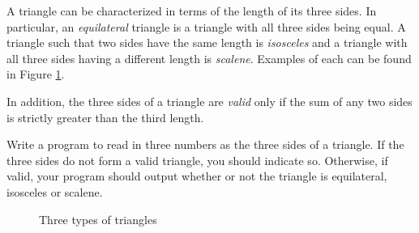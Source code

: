 \begin{exer}
A triangle can be characterized in terms of the length of its three sides.  In particular, an \emph{equilateral}
triangle is a triangle with all three sides being equal.  A triangle such that two sides have the same length 
is \emph{isosceles} and a triangle with all three sides having a different length is \emph{scalene}.  Examples
of each can be found in Figure \ref{figure:triangleTypes}.

In addition, the three sides of a triangle are \emph{valid} only if the sum of any two sides is strictly greater 
than the third length.

Write a program to read in three numbers as the three sides of a triangle.  If the three sides do not
form a valid triangle, you should indicate so.  Otherwise, if valid, your program should output whether or
not the triangle is equilateral, isosceles or scalene.

\begin{figure}[h]
\centering
{}
\caption{Three types of triangles}
\label{figure:triangleTypes}
\end{figure}

\end{exer}

